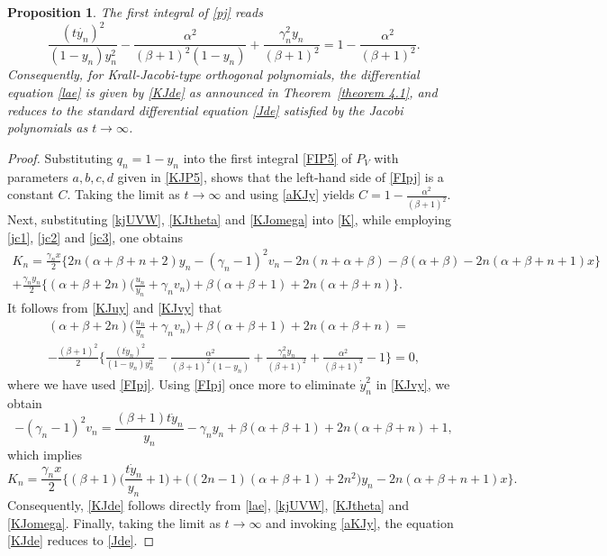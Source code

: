 \documentclass[10pt, reqno]{amsart}
\numberwithin{equation}{section}
\newtheorem{proposition}{Proposition}[section]
\numberwithin{equation}{section}
\begin{document}
\begin{proposition} \label{proposition 4.1}
The first integral of \eqref{pj} reads
\begin{equation}
\frac{(t\dot{y_n})^2}{(1-y_n)y_n^2}-\frac{\alpha^2}{(\beta+1)^2(1-y_n)}+\frac{\gamma_n^2y_n}{(\beta+1)^2}=1-\frac{\alpha^2}{(\beta+1)^2}.\label{FIpj}
\end{equation}
Consequently, for Krall-Jacobi-type orthogonal polynomials, the differential equation \eqref{lae} is given by \eqref{KJde} as announced in Theorem~\ref{theorem 4.1}, and reduces to the standard differential equation \eqref{Jde} satisfied by the Jacobi polynomials as $t\to\infty$.
\end{proposition}
\begin{proof}
Substituting $q_n=1-y_n$ into the first integral \eqref{FIP5} of $P_V$ with parameters $a,b,c,d$ given in \eqref{KJP5}, shows that the left-hand side of \eqref{FIpj} is a constant $C$. Taking the limit as $t \to\infty$ and using \eqref{aKJy} yields
$C=1-\frac{\alpha^2}{(\beta+1)^2}$. Next, substituting \eqref{kjUVW}, \eqref{KJtheta} and \eqref{KJomega} into \eqref{K}, while employing \eqref{jc1}, \eqref{jc2} and \eqref{jc3}, one obtains 
\begin{multline}
K_n=\frac{\gamma_n x}{2}\Big\{2n(\alpha+\beta+n+2)y_n-(\gamma_n-1)^2v_n-2n(n+\alpha+\beta)-\beta(\alpha+\beta)-2n(\alpha+\beta+n+1)x\Big\}\\
+\frac{\gamma_ny_n}{2}\Big\{(\alpha+\beta+2n)\Big(\frac{u_n}{y_n}+\gamma_nv_n\Big)+\beta(\alpha+\beta+1)+2n(\alpha+\beta+n)\Big\}\label{Kkjt}.
\end{multline}
It follows from \eqref{KJuy} and \eqref{KJvy} that
\begin{multline}
(\alpha+\beta+2n)\Big(\frac{u_n}{y_n}+\gamma_nv_n\Big)+\beta(\alpha+\beta+1)+2n(\alpha+\beta+n)=\\-\frac{(\beta+1)^2}{2}\Big\{\frac{(t\dot{y}_n)^2}{(1-y_n)y_n^2}
-\frac{\alpha^2}{(\beta+1)^2(1-y_n)}+\frac{\gamma_n^2y_n}{(\beta+1)^2}+\frac{\alpha^2}{(\beta+1)^2}-1\Big\}=0, \label{Kkjt0}
\end{multline}
where we have used \eqref{FIpj}. Using \eqref{FIpj} once more to eliminate $\dot{y}_n^2$ in \eqref{KJvy}, we obtain
\begin{equation*}
-(\gamma_n-1)^2v_n=\frac{(\beta+1)t\dot{y}_n}{y_n}-\gamma_ny_n+\beta(\alpha+\beta+1)+2n(\alpha+\beta+n)+1,
\end{equation*}
which implies
\begin{equation*}
K_n=\frac{\gamma_n x}{2}\Big\{(\beta+1)\Big(\frac{t\dot{y}_n}{y_n}+1\Big)+\big((2n-1)(\alpha+\beta+1)+2n^2\big)y_n-2n(\alpha+\beta+n+1)x\Big\}.
\end{equation*}
Consequently, \eqref{KJde} follows directly from \eqref{lae}, \eqref{kjUVW}, \eqref{KJtheta} and \eqref{KJomega}. Finally, taking the limit as $t\to\infty$ and invoking \eqref{aKJy}, the equation \eqref{KJde} reduces to \eqref{Jde}. 
\end{proof}
\end{document}
